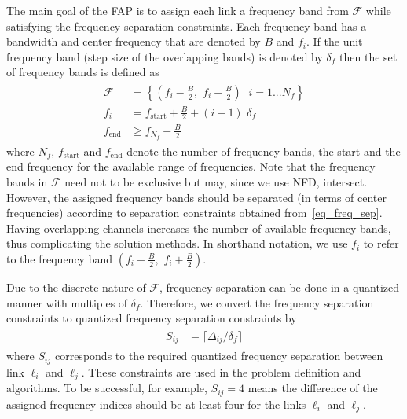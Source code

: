 \documentclass[10pt,twocolumn,twoside]{JCNtran}
\newcommand{\tbirkan}[1]{#1}
\newcommand{\linkl}{\ell}
\newcommand{\numfreq}{N_{f}}
\newcommand{\setFreq}{\mathcal{F}}
\newcommand{\freqsep}[2]{\Delta_{#1#2}}
\newcommand{\freqsepQuantized}[2]{S_{#1#2}}
\newcommand{\freqshift}{\mbox{$\delta_{f}$}}
\begin{document}
The main goal of the FAP is to assign each link a frequency band from $\setFreq$ while satisfying the frequency separation constraints. Each frequency band has a bandwidth and center frequency that are denoted by $B$ and $f_i$. If the unit frequency band (step size of the overlapping bands) is denoted by $\freqshift$ then the set of frequency bands is defined as
\begin{align}
\begin{split}
\setFreq &= \left\{ \left(f_i\!-\!\frac{B}{2}, \,\, f_i\!+\!\frac{B}{2}\right) \,\, \Big| i=1...\numfreq\right\}\\
f_i & = f_{\text{start}} + \frac{B}{2} +(i-1)\,\, \freqshift  \\
f_{\text{end}} & \geq f_{\numfreq}+\frac{B}{2}
\end{split}
\end{align}
where $\numfreq$, $f_{\text{start}}$ and $f_{\text{end}}$ denote the number of frequency bands, the start and the end frequency for the available range of frequencies. Note that the frequency bands in $\setFreq$ need not to be exclusive but may, \tbirkan{since we use NFD}, intersect. However, the assigned frequency bands should be separated (in terms of center frequencies) according to separation constraints obtained from~\eqref{eq_freq_sep}. \tbirkan{Having overlapping channels increases the number of available frequency bands, thus complicating the solution methods.} In shorthand notation, we use $f_i$ to refer to the frequency band $(f_i-\frac{B}{2}, \,\, f_i+\frac{B}{2})$. 

Due to the discrete nature of $\setFreq$, frequency separation can be done in a quantized manner with multiples of $\freqshift$. Therefore, we convert the frequency separation constraints to quantized frequency separation constraints by 
\begin{align}
\begin{split}
\freqsepQuantized{i}{j} &= \lceil\freqsep{i}{j} / \freqshift \rceil
\end{split}
\end{align}
where $\freqsepQuantized{i}{j}$ corresponds to the required quantized frequency separation between link $\linkl_i$ and $\linkl_j$. These constraints are used in the problem definition and algorithms. To be successful, for example, $\freqsepQuantized{i}{j} = 4$ means the difference of the assigned frequency indices should be at least four for the links $\linkl_i$ and $\linkl_j$.
\end{document}
